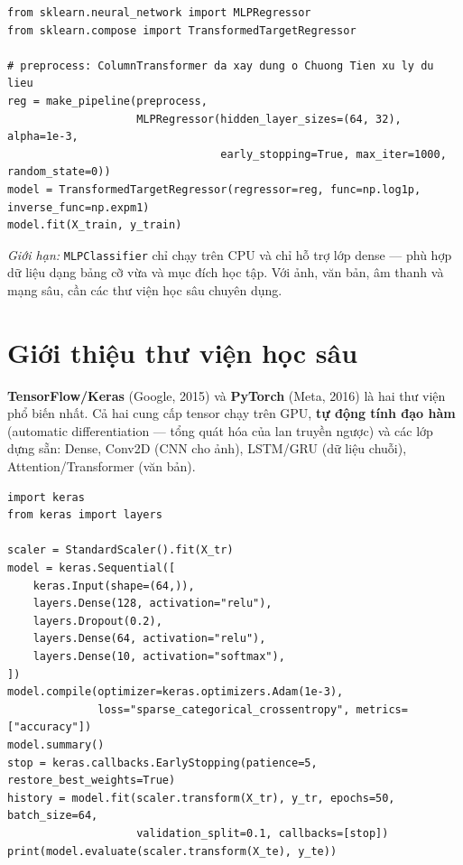 \begin{lstlisting}[caption={MLPRegressor dự đoán giá nhà Ames}]
from sklearn.neural_network import MLPRegressor
from sklearn.compose import TransformedTargetRegressor

# preprocess: ColumnTransformer da xay dung o Chuong Tien xu ly du lieu
reg = make_pipeline(preprocess,
                    MLPRegressor(hidden_layer_sizes=(64, 32), alpha=1e-3,
                                 early_stopping=True, max_iter=1000, random_state=0))
model = TransformedTargetRegressor(regressor=reg, func=np.log1p, inverse_func=np.expm1)
model.fit(X_train, y_train)
\end{lstlisting}

\noindent\textit{Giới hạn:} \texttt{MLPClassifier} chỉ chạy trên CPU và chỉ hỗ trợ lớp dense --- phù hợp dữ liệu dạng bảng cỡ vừa và mục đích học tập. Với ảnh, văn bản, âm thanh và mạng sâu, cần các thư viện học sâu chuyên dụng.

\section{Giới thiệu thư viện học sâu}

\textbf{TensorFlow/Keras} (Google, 2015) và \textbf{PyTorch} (Meta, 2016) là hai thư viện phổ biến nhất. Cả hai cung cấp tensor chạy trên GPU, \textbf{tự động tính đạo hàm} (automatic differentiation --- tổng quát hóa của lan truyền ngược) và các lớp dựng sẵn: Dense, Conv2D (CNN cho ảnh), LSTM/GRU (dữ liệu chuỗi), Attention/Transformer (văn bản).

\begin{lstlisting}[caption={Cùng bài toán digits với Keras}]
import keras
from keras import layers

scaler = StandardScaler().fit(X_tr)
model = keras.Sequential([
    keras.Input(shape=(64,)),
    layers.Dense(128, activation="relu"),
    layers.Dropout(0.2),
    layers.Dense(64, activation="relu"),
    layers.Dense(10, activation="softmax"),
])
model.compile(optimizer=keras.optimizers.Adam(1e-3),
              loss="sparse_categorical_crossentropy", metrics=["accuracy"])
model.summary()
stop = keras.callbacks.EarlyStopping(patience=5, restore_best_weights=True)
history = model.fit(scaler.transform(X_tr), y_tr, epochs=50, batch_size=64,
                    validation_split=0.1, callbacks=[stop])
print(model.evaluate(scaler.transform(X_te), y_te))
\end{lstlisting}

